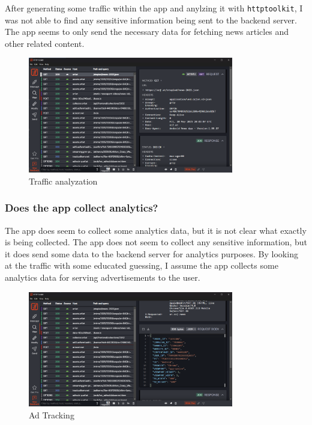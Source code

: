 \documentclass[12pt,a4paper]{article}
\begin{document}
After generating some traffic within the app and anylzing it with \texttt{httptoolkit}, I was not able to find any sensitive information being sent to the backend server. 
The app seems to only send the necessary data for fetching news articles and other related content.

\begin{figure}[H]
\centering
\includegraphics[width=0.8\textwidth]{./screenshots/Traffic_analyzation.png}
\caption{Traffic analyzation}
\end{figure}

\subsubsection{Does the app collect analytics?}

The app does seem to collect some analytics data, but it is not clear what exactly is being collected. The app does not seem to collect any sensitive information, but it does send some data to the backend server for analytics purposes.
By looking at the traffic with some educated guessing, I assume the app collects some analytics data for serving advertisements to the user.

\begin{figure}[H]
\centering
\includegraphics[width=0.8\textwidth]{./screenshots/ad_tracking.png}
\caption{Ad Tracking}
\end{figure}
\end{document}
